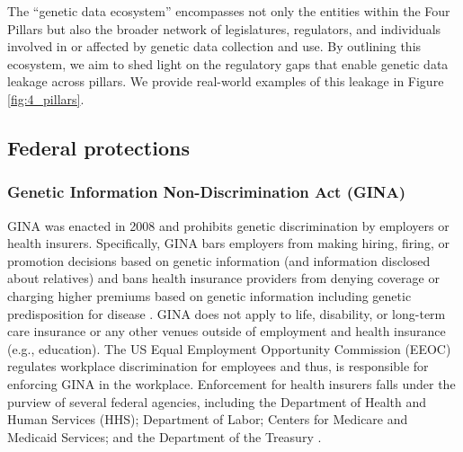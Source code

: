 The ``genetic data ecosystem'' encompasses not only the entities within the Four Pillars but also the broader network of legislatures, regulators, and individuals involved in or affected by genetic data collection and use. By outlining this ecosystem, we aim to shed light on the regulatory gaps that enable genetic data leakage across pillars. We provide real-world examples of this leakage in Figure \ref{fig:4_pillars}.



\subsection{Federal protections}

\subsubsection{Genetic Information Non-Discrimination Act (GINA)}
GINA was enacted in 2008 and prohibits genetic discrimination by employers or health insurers. Specifically, GINA bars employers from making hiring, firing, or promotion decisions based on genetic information (and information disclosed about relatives) and bans health insurance providers from denying coverage or charging higher premiums based on genetic information including genetic predisposition for disease \cite{gina_2008}. GINA does not apply to life, disability, or long-term care insurance \cite{green_strategic_2020} or any other venues outside of employment and health insurance (e.g., education). The US Equal Employment Opportunity Commission (EEOC) regulates workplace discrimination for employees and thus, is responsible for enforcing GINA in the workplace. Enforcement for health insurers falls under the purview of several federal agencies, including the Department of Health and Human Services (HHS); Department of Labor; Centers for Medicare and Medicaid Services; and the Department of the Treasury \cite{protections_ohrp_federal_2009}. 


